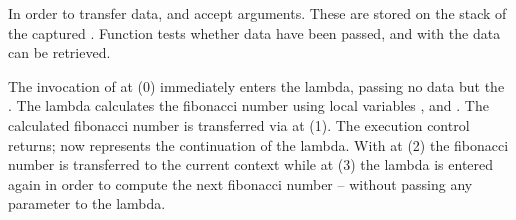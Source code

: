 In order to transfer data, \callcc and \resume accept arguments. These are
stored on the stack of the captured \currcont. Function \dataavail tests whether data
have been passed, and with \getdata the data can be retrieved.

The invocation of \callcc at (0) immediately enters the lambda, passing no data
but the \currcont. The lambda calculates the fibonacci number using local
variables ,  and . The calculated fibonacci number is
transferred via \resume at (1). The execution control returns;  now
represents the continuation of the lambda. With \getdata at (2) the fibonacci
number is transferred to the current context while at (3) the lambda is entered
again in order to compute the next fibonacci number -- without passing any
parameter to the lambda.
